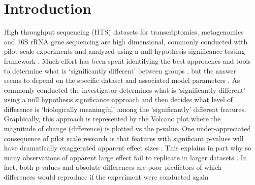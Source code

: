 \documentclass{bioinfo}
\begin{document}
\section{Introduction}



High throughput sequencing (HTS) datasets for transcriptomics, metagenomics and 16S rRNA gene sequencing are high dimensional, commonly conducted with pilot-scale  experiments and analyzed using a null hypothesis significance testing framework \citep{Schurch:2016aa}. Much effort has been spent identifying the best approaches and tools to determine what is `significantly different' between groups \citep{Soneson:2013,Schurch:2016aa}, but the answer seems to depend on the specific dataset and associated model parameters \citep{Thorsen:2016aa,hawinkel2017,Weiss:2017aa}. As commonly conducted the investigator determines what is `significantly different' using a null hypothesis significance approach and then decides what level of difference is `biologically meaningful' among the `significantly' different features. Graphically, this approach is  represented by the Volcano plot \citep{Cui:2003aa} where the magnitude of change (difference) is plotted vs the p-value.  One under-appreciated consequence of pilot scale research is that features with significant p-values   will have dramatically exaggerated  apparent effect sizes \citep{Halsey:2015aa}. This explains in part why so many observations  of apparent large effect fail to replicate in larger datasets \citep{Ioannidis:2005aa}. In fact, both p-values and absolute differences are poor predictors of which differences would reproduce if the experiment were conducted again \citep{Cumming:2008aa,Halsey:2015aa}


\end{document}
